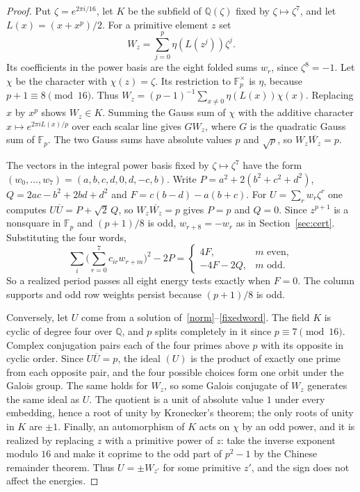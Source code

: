 \documentclass[11pt]{article}
\theoremstyle{remark}
\newcommand{\F}{\mathbb F}
\begin{document}
\begin{proof}
Put $\zeta=e^{2\pi i/16}$, let $K$ be the subfield of $\mathbb Q(\zeta)$ fixed by $\zeta\mapsto\zeta^7$, and let $L(x)=(x+x^p)/2$. For a primitive element $z$ set
\[
 W_z=\sum_{j=0}^{p}\eta(L(z^j))\zeta^j.
\]
Its coefficients in the power basis are the eight folded sums $w_r$, since $\zeta^8=-1$. Let $\chi$ be the character with $\chi(z)=\zeta$. Its restriction to $\F_p^\times$ is $\eta$, because $p+1\equiv8\pmod{16}$. Thus $W_z=(p-1)^{-1}\sum_{x\ne0}\eta(L(x))\chi(x)$. Replacing $x$ by $x^p$ shows $W_z\in K$. Summing the Gauss sum of $\chi$ with the additive character $x\mapsto e^{2\pi iL(x)/p}$ over each scalar line gives $GW_z$, where $G$ is the quadratic Gauss sum of $\F_p$. The two Gauss sums have absolute values $p$ and $\sqrt p$, so $W_z\overline{W_z}=p$.

The vectors in the integral power basis fixed by $\zeta\mapsto\zeta^7$ have the form $(w_0,\ldots,w_7)=(a,b,c,d,0,d,-c,b)$. Write $P=a^2+2(b^2+c^2+d^2)$, $Q=2ac-b^2+2bd+d^2$ and $F=c(b-d)-a(b+c)$. For $U=\sum_rw_r\zeta^r$ one computes $U\overline U=P+\sqrt2\,Q$, so $W_z\overline{W_z}=p$ gives $P=p$ and $Q=0$. Since $z^{p+1}$ is a nonsquare in $\F_p$ and $(p+1)/8$ is odd, $w_{r+8}=-w_r$ as in Section~\ref{sec:cert}. Substituting the four words,
\[
 \sum_i\Big(\sum_{r=0}^7c_{ir}w_{r+m}\Big)^2-2P=\begin{cases}4F,&m\text{ even},\\-4F-2Q,&m\text{ odd}.\end{cases}
\]
So a realized period passes all eight energy tests exactly when $F=0$. The column supports and odd row weights persist because $(p+1)/8$ is odd.

Conversely, let $U$ come from a solution of~\eqref{norm}--\eqref{fixedword}. The field $K$ is cyclic of degree four over $\mathbb Q$, and $p$ splits completely in it since $p\equiv7\pmod{16}$. Complex conjugation pairs each of the four primes above $p$ with its opposite in cyclic order. Since $U\overline U=p$, the ideal $(U)$ is the product of exactly one prime from each opposite pair, and the four possible choices form one orbit under the Galois group. The same holds for $W_z$, so some Galois conjugate of $W_z$ generates the same ideal as $U$. The quotient is a unit of absolute value $1$ under every embedding, hence a root of unity by Kronecker's theorem; the only roots of unity in $K$ are $\pm1$. Finally, an automorphism of $K$ acts on $\chi$ by an odd power, and it is realized by replacing $z$ with a primitive power of $z$: take the inverse exponent modulo $16$ and make it coprime to the odd part of $p^2-1$ by the Chinese remainder theorem. Thus $U=\pm W_{z'}$ for some primitive $z'$, and the sign does not affect the energies.
\end{proof}
\end{document}
